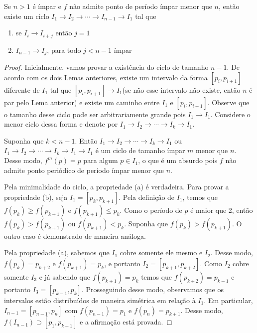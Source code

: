 \begin{lemma}
Se $n > 1$ é ímpar e $f$ não admite ponto de período ímpar menor que $n$, então existe um ciclo $I_1 \longrightarrow I_2 \longrightarrow \cdots \longrightarrow I_{n-1} \longrightarrow I_1$ tal que
\begin{enumerate}[label=(\alph*)]
\item se $I_i \longrightarrow I_{i+j}$ então $j = 1$
\item $I_{n-1} \longrightarrow I_j$, para todo $j < n-1$ ímpar
\end{enumerate} 
\end{lemma}

\begin{proof}
Inicialmente, vamos provar a existência do ciclo de tamanho $n-1$. De acordo com os dois Lemas anteriores, existe um intervalo da forma $[p_i, p_{i+1}]$ diferente de $I_1$ tal que $[p_i, p_{i+1}] \longrightarrow I_1$(se não esse intervalo não existe, então $n$ é par pelo Lema anterior) e existe um caminho entre $I_1$ e $[p_i, p_{i+1}]$. Observe que o tamanho desse ciclo pode ser arbitrariamente grande pois $I_1 \longrightarrow I_1$. Considere o menor ciclo dessa forma e denote por $I_1 \longrightarrow I_2 \longrightarrow \cdots \longrightarrow I_k \longrightarrow I_1$.

Suponha que $k < n-1$. Então $I_1 \longrightarrow I_2 \longrightarrow \cdots \longrightarrow I_k \longrightarrow I_1$ ou $I_1 \longrightarrow I_2 \longrightarrow \cdots \longrightarrow I_k \longrightarrow I_1 \longrightarrow I_1$ é um ciclo de tamanho ímpar $m$ menor que $n$. Desse modo, $f^m(p) = p$ para algum $p \in I_1$, o que é um absurdo pois $f$ não admite ponto periódico de período ímpar menor que $n$.

Pela minimalidade do ciclo, a propriedade (a) é verdadeira. Para provar a propriedade (b), seja $I_1 = [p_k, p_{k+1}]$. Pela definição de $I_1$, temos que $f(p_k) \geq f(p_{k+1})$ e $f(p_{k+1}) \leq p_k$. Como o período de $p$ é maior que 2, então $f(p_k) > f(p_{k+1})$ ou $f(p_{k+1}) < p_k$. Suponha que  $f(p_k) > f(p_{k+1})$. O outro caso é demonstrado de maneira análoga.

Pela propriedade (a), sabemos que $I_1$ cobre somente ele mesmo e $I_2$. Desse modo, $f(p_k) = p_{k+2}$ e $f(p_{k+1}) = p_k$, e portanto $I_2 = [p_{k+1}, p_{k+2}]$. Como $I_2$ cobre somente $I_3$ e já sabendo que $f(p_{k+1}) = p_k$ temos que $f(p_{k+2}) = p_{k-1}$ e portanto $I_3 = [p_{k-1}, p_k]$. Prosseguindo desse modo, observamos que os intervalos estão distribuídos de maneira simétrica em relação à $I_1$. Em particular, $I_{n-1} = [p_{n-1}, p_n]$ com $f(p_{n-1}) = p_1$ e $f(p_n) = p_{k+1}$. Desse modo, $f(I_{n-1}) \supset [p_1, p_{k+1}]$ e a afirmação está provada.
\end{proof}

